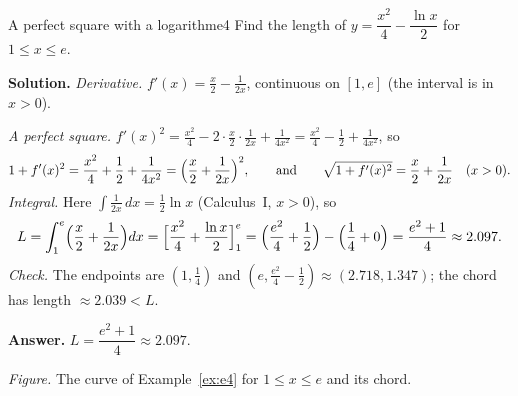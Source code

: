 \documentclass[11pt]{article}
\begin{document}
\begin{exmp}{A perfect square with a logarithm}{e4}
Find the length of $y=\dfrac{x^2}4-\dfrac{\ln x}2$ for $1\le x\le e$.

\textbf{Solution.} \emph{Derivative.} $f'(x)=\frac x2-\frac1{2x}$, continuous on $[1,e]$ (the interval is in $x>0$).

\emph{A perfect square.} $f'(x)^2=\frac{x^2}4-2\cdot\frac x2\cdot\frac1{2x}+\frac1{4x^2}=\frac{x^2}4-\frac12+\frac1{4x^2}$, so
\[
1+f'(x)^2=\frac{x^2}4+\frac12+\frac1{4x^2}=\Bigl(\frac x2+\frac1{2x}\Bigr)^2,\qquad\text{and}\qquad\sqrt{1+f'(x)^2}=\frac x2+\frac1{2x}\quad(x>0).
\]
\emph{Integral.} Here $\int\frac1{2x}\,dx=\frac12\ln x$ (Calculus~I, $x>0$), so
\[
L=\int_1^e\Bigl(\frac x2+\frac1{2x}\Bigr)dx=\Bigl[\frac{x^2}4+\frac{\ln x}2\Bigr]_1^e=\Bigl(\frac{e^2}4+\frac12\Bigr)-\Bigl(\frac14+0\Bigr)=\frac{e^2+1}4\approx2.097 .
\]
\emph{Check.} The endpoints are $(1,\frac14)$ and $(e,\frac{e^2}4-\frac12)\approx(2.718,1.347)$; the chord has length $\approx2.039<L$.

\textbf{Answer.} $L=\dfrac{e^2+1}4\approx2.097$.
\begin{center}
\par\small\emph{Figure.} The curve of Example~\ref{ex:e4} for $1\le x\le e$ and its chord.
\end{center}
\end{exmp}
\end{document}
